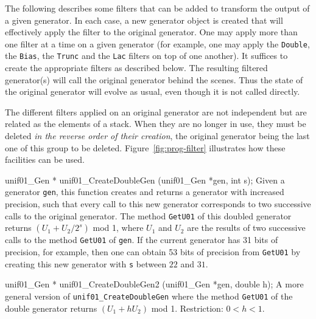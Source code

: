
The following describes some filters that can be added to transform 
the output of a given generator. In each case, a new generator object is
created that will effectively apply the filter to the original generator.
One may apply more than one filter at a time on a given generator
(for example, one may apply the {\tt Double}, the  {\tt Bias}, the 
 {\tt Trunc} and the {\tt Lac} filters on top of one another). It suffices
 to create the appropriate filters as described below.  The resulting 
filtered generator(s) will call the original generator behind the scenes.
Thus the state of the original generator will evolve as usual, even
though it is not called directly.


The different filters applied on an original generator are not independent
but are related as the elements of a stack. When they are no longer in use, 
they must be deleted {\em in the reverse order of their creation}, 
the original generator being the last one of this group to be deleted. 
Figure~\ref{fig:prog-filter} illustrates how these facilities can be used.

\code


unif01_Gen * unif01_CreateDoubleGen (unif01_Gen *gen, int s);
\endcode
 \tab
 Given a generator {\tt gen}, this function
%
 creates and returns a generator with increased precision, such that
 every call to this new generator
 corresponds to two successive calls  to the original generator.
 The method {\tt GetU01} of this doubled generator  returns
 $(U_1 +  U_2/2^s)$ mod 1, where $U_1$ and $U_2$ are the results of
 two successive calls  to the method {\tt GetU01} of {\tt gen}. 
 If the current generator has 31 bits of precision, for example,
 then one can obtain 53 bits of precision from {\tt GetU01} 
 by creating this new generator with {\tt s}  between $22$ and $31$.
 \endtab
\code


unif01_Gen * unif01_CreateDoubleGen2 (unif01_Gen *gen, double h);
\endcode
 \tab A more general version of {\tt unif01\_CreateDoubleGen} where
  the method {\tt GetU01} of the double generator  returns
  $(U_1 +  h U_2)$ mod 1. Restriction: $0 < h < 1$.
 \endtab
\code


